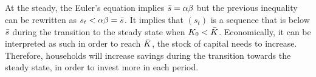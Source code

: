 \documentclass[12pt]{article}
\begin{document}
\subsection{}
At the steady, the Euler's equation implies $\Bar{s} = \alpha \beta$ but the previous inequality can be rewritten as $s_t < \alpha \beta = \Bar{s}$. It implies that $(s_t)$ is a sequence that is below $\Bar{s}$ during the transition to the steady state when $K_0 < \Bar{K}$.
Economically, it can be interpreted as such in order to reach $\Bar{K}$, the stock of capital needs to increase. Therefore, households will increase savings during the transition towards the steady state, in order to invest more in each period.
\end{document}
